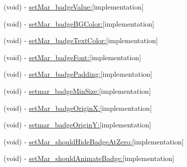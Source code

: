 \begin{DoxyCompactItemize}
\item 
(void) -\/ \hyperlink{category_u_i_bar_button_item_07_m_a_r_e_x___badge_08_a32868cad1e1e1ce998dccc786fb4c41d}{set\+Mar\+\_\+badge\+Value\+:}{\ttfamily  \mbox{[}implementation\mbox{]}}
\item 
(void) -\/ \hyperlink{category_u_i_bar_button_item_07_m_a_r_e_x___badge_08_a3bc2fbc69e0e15daba18e523aed8e45e}{set\+Mar\+\_\+badge\+B\+G\+Color\+:}{\ttfamily  \mbox{[}implementation\mbox{]}}
\item 
(void) -\/ \hyperlink{category_u_i_bar_button_item_07_m_a_r_e_x___badge_08_abd221afcba1982d9744d16d975a36f8d}{set\+Mar\+\_\+badge\+Text\+Color\+:}{\ttfamily  \mbox{[}implementation\mbox{]}}
\item 
(void) -\/ \hyperlink{category_u_i_bar_button_item_07_m_a_r_e_x___badge_08_ad6583ac515e06f49a394ffab67123216}{set\+Mar\+\_\+badge\+Font\+:}{\ttfamily  \mbox{[}implementation\mbox{]}}
\item 
(void) -\/ \hyperlink{category_u_i_bar_button_item_07_m_a_r_e_x___badge_08_ae89bc1df2557158cd65b7846e619eebc}{set\+Mar\+\_\+badge\+Padding\+:}{\ttfamily  \mbox{[}implementation\mbox{]}}
\item 
(void) -\/ \hyperlink{category_u_i_bar_button_item_07_m_a_r_e_x___badge_08_a8d5ba3097194e81b4f78be4ae89ce9aa}{setmar\+\_\+badge\+Min\+Size\+:}{\ttfamily  \mbox{[}implementation\mbox{]}}
\item 
(void) -\/ \hyperlink{category_u_i_bar_button_item_07_m_a_r_e_x___badge_08_a9ecc22b43333a9da99de376cef9844e4}{set\+Mar\+\_\+badge\+Origin\+X\+:}{\ttfamily  \mbox{[}implementation\mbox{]}}
\item 
(void) -\/ \hyperlink{category_u_i_bar_button_item_07_m_a_r_e_x___badge_08_a3997341b54732cc51c3c5d1e6508e63d}{setmar\+\_\+badge\+Origin\+Y\+:}{\ttfamily  \mbox{[}implementation\mbox{]}}
\item 
(void) -\/ \hyperlink{category_u_i_bar_button_item_07_m_a_r_e_x___badge_08_a86094637debca3cbbf38c6231f2781c7}{set\+Mar\+\_\+should\+Hide\+Badge\+At\+Zero\+:}{\ttfamily  \mbox{[}implementation\mbox{]}}
\item 
(void) -\/ \hyperlink{category_u_i_bar_button_item_07_m_a_r_e_x___badge_08_ac562e75d05ad860c15a3498ce6d9ed8f}{set\+Mar\+\_\+should\+Animate\+Badge\+:}{\ttfamily  \mbox{[}implementation\mbox{]}}
\end{DoxyCompactItemize}
